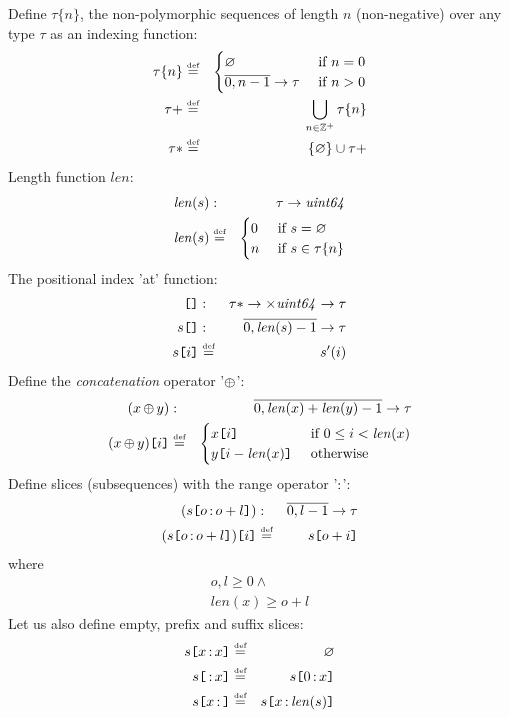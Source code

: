 \begin{definition}
Define $\tau\{n\}$, the non-polymorphic sequences of length $n$ (non-negative) over any type $\tau$ as an indexing function:
%
\begin{eqnarray}
\tau\{n\} &\overset{\textrm{\tiny def}}{=}& \begin{cases}\varnothing&\text{ if } n=0\\
\overline{0,n-1}\to \tau &\text{ if } n>0
\end{cases}\\
\tau{+}&\overset{\textrm{\tiny def}}{=}&\bigcup_{n\in \mathbb{Z}^{+}} \tau\{n\}\\
\tau{*}&\overset{\textrm{\tiny def}}{=}&\{\varnothing\}\cup\tau{+}\\
\end{eqnarray}
%
Length function $\mathit{len}$:
\begin{eqnarray}
\mathit{len}(s)&:&\tau\to\mathit{uint64} \\
\mathit{len}(s)&\overset{\textrm{\tiny def}}{=}& \begin{cases}
0 & \text{ if  } s=\varnothing\\
n & \text{ if  } s\in\tau\{n\}
\end{cases}
\end{eqnarray}
%
The positional index 'at' function:
\begin{eqnarray}
\texttt{[}\/\/\texttt{]}&:&\tau*\to\times\mathit{uint64}\to\tau\\
s\texttt{[}\/\/\texttt{]}&:&\overline{0,\mathit{len}(s)-1}\to\tau\\
s\texttt{[}\/i\/\texttt{]}&\overset{\textrm{\tiny def}}{=}&s'(i)   
\end{eqnarray}
%
Define the \emph{concatenation} operator '$\operatorname{\operatorname{\oplus}}$':
\begin{eqnarray}
(x\operatorname{\operatorname{\oplus}} y)&:& \overline{0, \mathit{len}(x) + \mathit{len}(y)-1}\to\tau\\
(x\operatorname{\operatorname{\oplus}} y)\texttt{[}\/i\/\texttt{]} &\overset{\textrm{\tiny def}}{=}& \begin{cases}x\texttt{[}\/i\/\texttt{]} & \text{ if  } 0\leq i< \mathit{len}(x)\\
y\texttt{[}\/i-\mathit{len}(x)\/\texttt{]}&\text{ otherwise } 
\end{cases}
\end{eqnarray}
%
Define slices (subsequences) with the range operator '$\operatorname{:}$':
\begin{eqnarray}
(s\texttt{[}\/o\operatorname{:} o+l\/\texttt{]})&:&\overline{0, l-1}\to\tau\\
(s\texttt{[}\/o\operatorname{:} o+l\/\texttt{]})\texttt{[}\/i\/\texttt{]}&\overset{\textrm{\tiny def}}{=}&s\texttt{[}\/o+i\/\texttt{]} 
\end{eqnarray}
where 
\begin{eqnarray}
o, l \geq 0\land\\
\mathit{len}(x)\geq o+l
\end{eqnarray}
%
Let us also define empty, prefix and suffix slices:
\begin{eqnarray}
s\texttt{[}\/x\operatorname{:} x\/\texttt{]} &\overset{\textrm{\tiny def}}{=}& \varnothing\\
s\texttt{[}\/\operatorname{:} x\/\texttt{]} &\overset{\textrm{\tiny def}}{=}& s\texttt{[}\/0\operatorname{:} x\/\texttt{]}\\        
s\texttt{[}\/x\operatorname{:}\/\texttt{]}  &\overset{\textrm{\tiny def}}{=}& s\texttt{[}\/x\operatorname{:} \mathit{len}(s)\/\texttt{]}
\end{eqnarray}
\end{definition}
